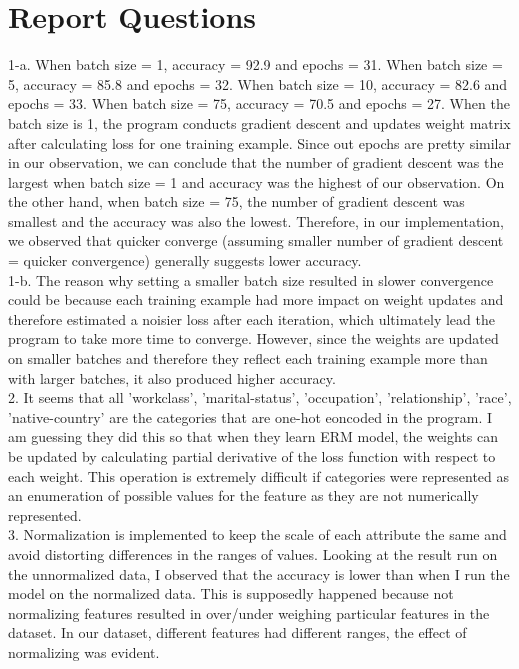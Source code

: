 \documentclass[12pt,letterpaper]{article}
\begin{document}
\graphicspath{ {/home/user/images/} }
\section*{Report Questions}
1-a. When batch size = 1, accuracy = 92.9 and epochs = 31. When batch size = 5, accuracy = 85.8 and epochs = 32. When batch size = 10, accuracy = 82.6 and epochs = 33. When batch size = 75, accuracy = 70.5 and epochs = 27. When the batch size is 1, the program conducts gradient descent and updates weight matrix after calculating loss for one training example. Since out epochs are pretty similar in our observation, we can conclude that the number of gradient descent was the largest when batch size = 1 and accuracy was the highest of our observation. On the other hand, when batch size = 75, the number of gradient descent was smallest and the accuracy was also the lowest. Therefore, in our implementation, we observed that quicker converge (assuming smaller number of gradient descent = quicker convergence) generally suggests lower accuracy.
\\

1-b. The reason why setting a smaller batch size resulted in slower convergence could be because each training example had more impact on weight updates and therefore estimated a noisier loss after each iteration, which ultimately lead the program to take more time to converge. However, since the weights are updated on smaller batches and therefore they reflect each training example more than with larger batches, it also produced higher accuracy. \\

2. It seems that all 'workclass', 'marital-status', 'occupation', 'relationship', 'race', 'native-country' are the categories that are one-hot eoncoded in the program. I am guessing they did this so that when they learn ERM model, the weights can be updated by calculating partial derivative of the loss function with respect to each weight. This operation is extremely difficult if categories were represented as an enumeration of possible values for the feature as they are not numerically represented. \\

3. Normalization is implemented to keep the scale of each attribute the same and avoid distorting differences in the ranges of values. Looking at the result run on the unnormalized data, I observed that the accuracy is lower than when I run the model on the normalized data. This is supposedly happened because not normalizing features resulted in over/under weighing particular features in the dataset. In our dataset, different features had different ranges, the effect of normalizing was evident.\\
\end{document}
